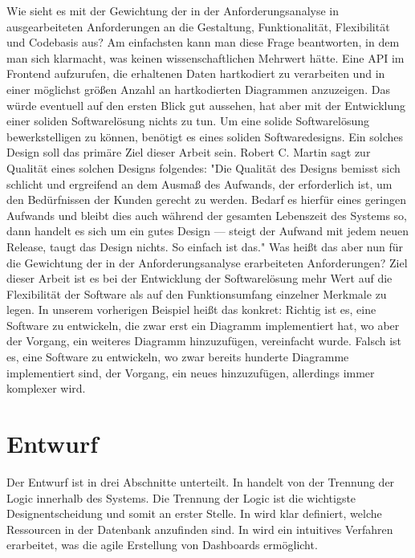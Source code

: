 Wie sieht es mit der Gewichtung der in der Anforderungsanalyse in 
ausgearbeiteten Anforderungen an die Gestaltung, Funktionalität, Flexibilität und Codebasis aus?
Am einfachsten kann man diese Frage beantworten, in dem man sich klarmacht, was keinen wissenschaftlichen
Mehrwert hätte. Eine API im Frontend aufzurufen, die erhaltenen Daten hartkodiert zu verarbeiten und
in einer möglichst größen Anzahl an hartkodierten Diagrammen anzuzeigen. Das würde eventuell auf den
ersten Blick gut aussehen, hat aber mit der Entwicklung einer soliden Softwarelösung nichts zu tun.
Um eine solide Softwarelösung bewerkstelligen zu können, benötigt es eines soliden Softwaredesigns.
Ein solches Design soll das primäre Ziel dieser Arbeit sein. Robert C. Martin sagt zur Qualität eines
solchen Designs folgendes:
"Die Qualität des Designs bemisst sich schlicht und ergreifend an dem Ausmaß des Aufwands, der
erforderlich ist, um den Bedürfnissen der Kunden gerecht zu werden. Bedarf es hierfür eines
geringen Aufwands und bleibt dies auch während der gesamten Lebenszeit des Systems so,
dann handelt es sich um ein gutes Design — steigt der Aufwand mit jedem neuen Release,
taugt das Design nichts. So einfach ist das."\cite[S. 30]{RobertC.Martin2018} Was heißt
das aber nun für die Gewichtung der in der Anforderungsanalyse erarbeiteten Anforderungen?
Ziel dieser Arbeit ist es bei der Entwicklung der Softwarelösung mehr Wert auf die Flexibilität
der Software als auf den Funktionsumfang einzelner Merkmale zu legen. In unserem
vorherigen Beispiel heißt das konkret: Richtig ist es, eine Software zu entwickeln, die zwar erst ein Diagramm
implementiert hat, wo aber der Vorgang, ein weiteres Diagramm hinzuzufügen, vereinfacht wurde.
Falsch ist es, eine Software zu entwickeln, wo zwar bereits hunderte Diagramme implementiert sind,
der Vorgang, ein neues hinzuzufügen, allerdings immer komplexer wird.

\section{Entwurf}
\label{sec:entwurf}
Der Entwurf ist in drei Abschnitte unterteilt. In  handelt von
der Trennung der Logic innerhalb des Systems. Die Trennung der Logic ist die wichtigste
Designentscheidung und somit an erster Stelle. In 
wird klar definiert, welche Ressourcen in der Datenbank anzufinden sind. In 
wird ein intuitives Verfahren erarbeitet, was die agile Erstellung von Dashboards
ermöglicht.

